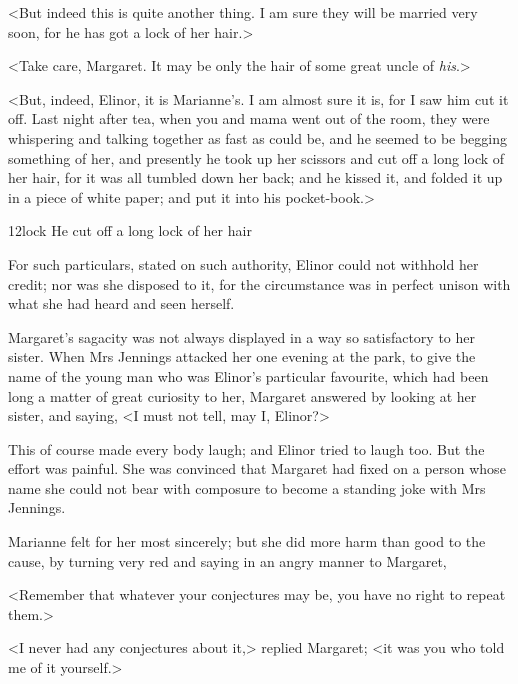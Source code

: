 <But indeed this is quite another thing. I am sure they will be married very soon, for he has got a lock of her hair.>

<Take care, Margaret. It may be only the hair of some great uncle of \textit{his}.>

<But, indeed, Elinor, it is Marianne's. I am almost sure it is, for I saw him cut it off. Last night after tea, when you and mama went out of the room, they were whispering and talking together as fast as could be, and he seemed to be begging something of her, and presently he took up her scissors and cut off a long lock of her hair, for it was all tumbled down her back; and he kissed it, and folded it up in a piece of white paper; and put it into his pocket-book.>


\begin{bwbigpic}
	[1.0]
	{12lock} 
	{He cut off a long lock of her hair} 
\end{bwbigpic}

For such particulars, stated on such authority, Elinor could not withhold her credit; nor was she disposed to it, for the circumstance was in perfect unison with what she had heard and seen herself.

Margaret's sagacity was not always displayed in a way so satisfactory to her sister. When Mrs Jennings attacked her one evening at the park, to give the name of the young man who was Elinor's particular favourite, which had been long a matter of great curiosity to her, Margaret answered by looking at her sister, and saying, <I must not tell, may I, Elinor?>

This of course made every body laugh; and Elinor tried to laugh too. But the effort was painful. She was convinced that Margaret had fixed on a person whose name she could not bear with composure to become a standing joke with Mrs Jennings.

Marianne felt for her most sincerely; but she did more harm than good to the cause, by turning very red and saying in an angry manner to Margaret,

<Remember that whatever your conjectures may be, you have no right to repeat them.>

<I never had any conjectures about it,> replied Margaret; <it was you who told me of it yourself.>

